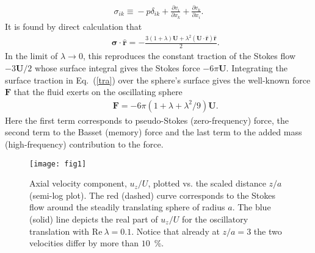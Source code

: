 \documentclass[aps,prx,twocolumn,amsmath,amssymb,amsfonts]{revtex4-2}
\newcommand{\rRe}{\mathrm{Re}}
\begin{document}
{\begin{eqnarray}
\sigma_{ik}\!\equiv\! - p\delta_{ik}\!+\!\frac{\partial v_i}{\partial x_k}\!+\!\frac{\partial v_k}{\partial x_i}.\label{dtr}
\end{eqnarray}
It is found by direct calculation that
\begin{eqnarray}&&\!\!\!\!\!\!\!\!\!\!\!\!\!
\bm\sigma \cdot \bm {\hat r}=-\frac{3(1+\lambda)\bm U+\lambda^2 (\bm U\cdot \bm {\hat r})\bm {\hat r}}{2}. \label{tra}
\end{eqnarray}
In the limit of $\lambda\!\to\! 0$, this reproduces the constant traction of the Stokes flow $-3\bm U/2$ whose surface integral gives the Stokes force $-6\pi \bm U$. Integrating the surface traction in Eq.~(\ref{tra}) over the sphere's surface gives the well-known force $\bm F$ that the fluid exerts on the oscillating sphere \cite{kim}
\begin{eqnarray}&&\!\!\!\!\!\!\!\!\!\!\!\!\!
\bm F=-6\pi(1+\lambda+\lambda^2/9) \bm U. \label{ford}
\end{eqnarray}
Here the first term corresponds to pseudo-Stokes (zero-frequency) force, the second term to the Basset (memory) force and the last term to the added mass (high-frequency) contribution to the force.

%
%

\begin{figure}
\texttt{[image: fig1]}
\caption{Axial velocity component, $u_z/U$, plotted vs. the scaled distance $z/a$ (semi-log plot). The red (dashed) curve corresponds to the Stokes flow around the steadily translating sphere of radius $a$. The blue (solid) line depicts the real part of $u_z/U$ for the oscillatory translation with $\rRe\ \lambda\!=\!0.1$. Notice that already at $z/a\!=\!3$ the two velocities differ by more than $10$~\%.}
\label{fig1}
\end{figure}

}
\end{document}
